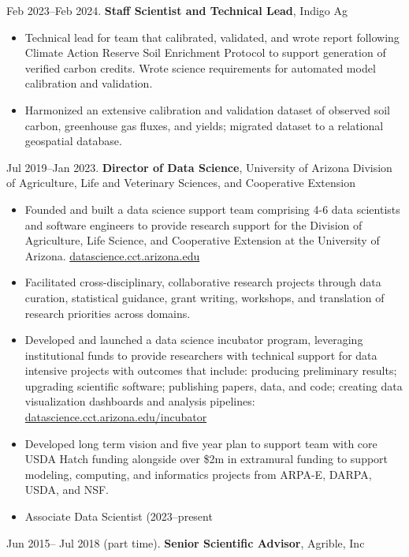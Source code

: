 \documentclass[a4paper,10pt]{article}
\begin{document}
Feb 2023--Feb 2024. \textbf{Staff Scientist and Technical Lead}, Indigo Ag

\begin{itemize}
\item Technical lead for team that calibrated, validated, and wrote report following Climate Action Reserve Soil Enrichment Protocol to support generation of verified carbon credits. Wrote science requirements for automated model calibration and validation.
\item Harmonized an extensive calibration and validation dataset of observed soil carbon, greenhouse gas fluxes, and yields; migrated dataset to a relational geospatial database.
\end{itemize}

Jul 2019--Jan 2023. \textbf{Director of Data Science}, University of Arizona Division of Agriculture, Life and Veterinary Sciences, and Cooperative Extension

\begin{itemize}
\item Founded and built a data science support team comprising 4-6 data scientists and software engineers to provide research support for the Division of Agriculture, Life Science, and Cooperative Extension at the University of Arizona. \href{https://datascience.cct.arizona.edu}{datascience.cct.arizona.edu} 
\item Facilitated cross-disciplinary, collaborative research projects through data curation, statistical guidance, grant writing, workshops, and translation of research priorities across domains.
\item Developed and launched a data science incubator program, leveraging institutional funds to provide researchers with technical support for data intensive projects with outcomes that include: producing preliminary results; upgrading scientific software; publishing papers, data, and code; creating data visualization dashboards and analysis pipelines: \href{https://datascience.cct.arizona.edu/incubator}{datascience.cct.arizona.edu/incubator}
\item Developed long term vision and five year plan to support team with core USDA Hatch funding alongside over \$2m in extramural funding to support modeling, computing, and informatics projects from ARPA-E, DARPA, USDA, and NSF.
\item{Associate Data Scientist (2023--present}
\end{itemize}


Jun 2015-- Jul 2018 (part time). \textbf{Senior Scientific Advisor}, Agrible, Inc
\end{document}
